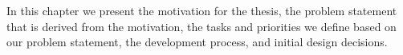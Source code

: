 

In this chapter we present the motivation for the thesis, the problem statement that is derived from the motivation, the tasks and priorities we define based on our problem statement, the development process, and initial design decisions.